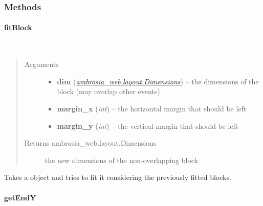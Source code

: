 \documentclass[letterpaper,10pt,english]{sphinxmanual}
\begin{document}
\subsubsection{Methods}
\label{ambrosia_web.layout.BlockLayoutManager:methods}

\paragraph{fitBlock}
\label{ambrosia_web.layout.BlockLayoutManager:fitblock}

\begin{fulllineitems}
\label{ambrosia_web.layout.BlockLayoutManager:ambrosia_web.layout.BlockLayoutManager.fitBlock}~\begin{quote}\begin{description}
\item[{Arguments}] \leavevmode\begin{itemize}
\item {} 
\textbf{dim} ({\hyperref[ambrosia_web.layout.Dimensions:ambrosia_web.layout.Dimensions]{\emph{ambrosia\_web.layout.Dimensions}}}) -- the dimensions of the block (may overlap other events)

\item {} 
\textbf{margin\_x} (\emph{int}) -- the horizontal margin that should be left

\item {} 
\textbf{margin\_y} (\emph{int}) -- the vertical margin that should be left

\end{itemize}

\item[{Returns ambrosia\_web.layout.Dimensions}] \leavevmode
the new dimensions of the non-overlapping block

\end{description}\end{quote}

\end{fulllineitems}


Takes a {\hyperref[ambrosia_web.layout.Dimensions:ambrosia_web.layout.Dimensions]{}} object and tries to fit it considering the previously
fitted blocks.


\paragraph{getEndY}
\label{ambrosia_web.layout.BlockLayoutManager:getendy}
\end{document}
